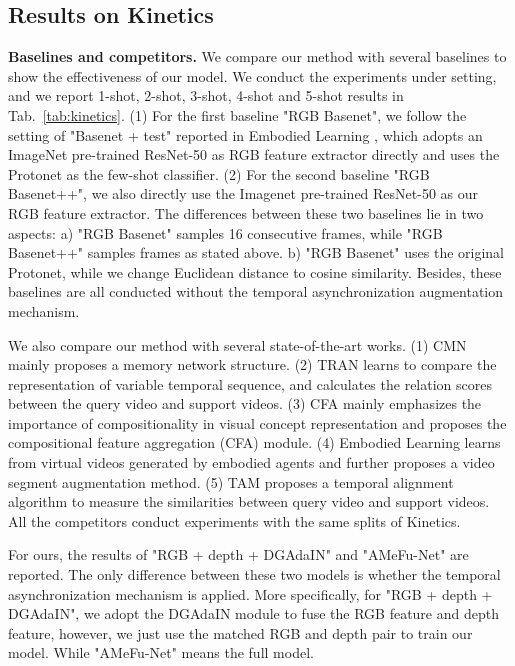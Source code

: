 \documentclass[sigconf]{acmart}
\begin{document}
	\subsection{Results on Kinetics}
	\noindent\textbf{Baselines and competitors.} 
	We compare our method with several baselines to show the effectiveness of our model. We conduct the experiments under  setting, and we report 1-shot, 2-shot, 3-shot, 4-shot and 5-shot results in Tab.~\ref{tab:kinetics}. (1) For the first baseline "RGB Basenet", we follow the setting of "Basenet + test" reported in Embodied Learning \cite{fu2019embodied}, which adopts an ImageNet pre-trained ResNet-50 as RGB feature extractor directly and uses the Protonet as the few-shot classifier.  (2) For the second baseline "RGB Basenet++", we also directly use the Imagenet pre-trained ResNet-50 as our RGB feature extractor. The differences between these two baselines lie in two aspects: a) "RGB  Basenet" samples 16 consecutive frames, while "RGB Basenet++" samples  frames as stated above. b) "RGB Basenet" uses the original Protonet, while we change Euclidean distance to cosine similarity. Besides, these baselines are all conducted without the temporal asynchronization augmentation mechanism.
	
	We also compare our method with several state-of-the-art works. (1) CMN \cite{zhu2018compound} mainly proposes a memory network structure. (2) TRAN \cite{bishay2019tarn} learns to compare the representation of variable temporal sequence, and calculates the relation scores between the query video and support videos. (3) CFA \cite{hu2019weakly} mainly emphasizes the importance of compositionality in visual concept representation and proposes the compositional feature aggregation (CFA) module. (4) Embodied Learning \cite{fu2019embodied} learns from virtual videos generated by embodied agents and further proposes a video segment augmentation method. (5) TAM \cite{cao2019few} proposes a temporal alignment algorithm to measure the similarities between query video and support videos. All the competitors conduct experiments with the same splits of Kinetics.
	
	For ours, the results of "RGB + depth + DGAdaIN" and "AMeFu-Net" are reported. The only difference between these two models is whether the temporal asynchronization mechanism is applied. More specifically, for "RGB + depth + DGAdaIN", we adopt the DGAdaIN module to fuse the RGB feature and depth feature, however, we just use the matched RGB and depth pair to train our model. While "AMeFu-Net" means the full model.
	
\end{document}
